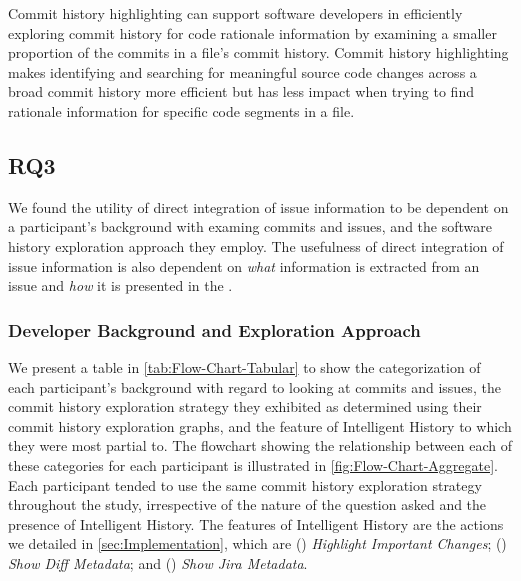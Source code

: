 \begin{summary}[RQ2]
  Commit history highlighting can support software developers in efficiently 
  exploring commit history for code rationale information 
  by examining a smaller proportion of the commits in a file's commit history.
  Commit history highlighting makes identifying and searching for meaningful source code changes 
  across a broad commit history more efficient but has less impact when trying to find rationale information for specific code segments in a file.
\end{summary}


\subsection{RQ3}
\label{subsec:RQ3}


We found the utility of direct integration of issue information 
to be dependent on a participant's background with examing commits and issues,
and the software history exploration approach they employ.
The usefulness of direct integration of issue information is also dependent on 
\emph{what} information is extracted from an issue and \emph{how} it is presented in the .

\subsubsection{Developer Background and Exploration Approach}

We present a table in \autoref{tab:Flow-Chart-Tabular} to show the
categorization of each participant's background with regard to looking at commits
and issues, the commit history exploration strategy they exhibited as determined
using their commit history exploration graphs, and the feature of Intelligent History
to which they were most partial to.
The flowchart showing the relationship between each of these categories for each participant
is illustrated in \autoref{fig:Flow-Chart-Aggregate}.
Each participant tended to use the same commit history exploration strategy throughout the study, 
irrespective of the nature of the question asked and the presence of Intelligent History.
The features of Intelligent History are the actions we detailed in \autoref{sec:Implementation}, which are 
() \textit{Highlight Important Changes}; 
() \textit{Show Diff Metadata}; 
and () \textit{Show Jira Metadata}.

